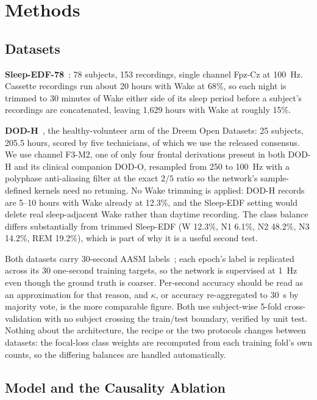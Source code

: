 \documentclass[conference]{IEEEtran}
\begin{document}
\section{Methods}

\subsection{Datasets}

\textbf{Sleep-EDF-78}~\cite{physionet,kemp}: 78 subjects, 153 recordings, single channel Fpz-Cz at
100~Hz. Cassette recordings run about 20 hours with Wake at 68\%, so each night is trimmed to 30
minutes of Wake either side of its sleep period before a subject's recordings are concatenated,
leaving 1{,}629 hours with Wake at roughly 15\%.

\textbf{DOD-H}~\cite{dod}, the healthy-volunteer arm of the Dreem Open Datasets: 25 subjects,
205.5 hours, scored by five technicians, of which we use the released consensus. We use channel
F3-M2, one of only four frontal derivations present in both DOD-H and its clinical companion
DOD-O, resampled from 250 to 100~Hz with a polyphase anti-aliasing filter at the exact $2/5$ ratio
so the network's sample-defined kernels need no retuning. No Wake trimming is applied: DOD-H
records are 5--10 hours with Wake already at 12.3\%, and the Sleep-EDF setting would delete real
sleep-adjacent Wake rather than daytime recording. The class balance differs substantially from
trimmed Sleep-EDF (W 12.3\%, N1 6.1\%, N2 48.2\%, N3 14.2\%, REM 19.2\%), which is part of why it
is a useful second test.

Both datasets carry 30-second AASM labels~\cite{aasm}; each epoch's label is replicated across its
30 one-second training targets, so the network is supervised at 1~Hz even though the ground truth
is coarser. Per-second accuracy should be read as an approximation for that reason, and $\kappa$,
or accuracy re-aggregated to 30~s by majority vote, is the more comparable figure. Both use
subject-wise 5-fold cross-validation with no subject crossing the train/test boundary, verified by
unit test. Nothing about the architecture, the recipe or the two protocols changes between
datasets: the focal-loss class weights are recomputed from each training fold's own counts, so the
differing balances are handled automatically.

\subsection{Model and the Causality Ablation}
\end{document}
